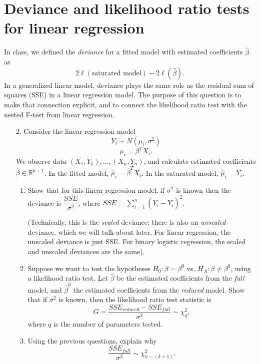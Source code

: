 \documentclass[11pt]{article}
\begin{document}
\section*{Deviance and likelihood ratio tests for linear regression}

In class, we defined the \textit{deviance} for a fitted model with estimated coefficients $\widehat{\beta}$ as 
$$2 \ell(\text{saturated model}) - 2 \ell (\widehat{\beta}).$$
In a generalized linear model, deviance plays the same role as the residual sum of squares (SSE) in a linear regression model. The purpose of this question is to make that connection explicit, and to connect the likelihood ratio test with the nested F-test from linear regression.

\begin{enumerate}
\item[2.] Consider the linear regression model
$$Y_i \sim N(\mu_i, \sigma^2)$$
$$\mu_i = \beta^T X_i.$$
We observe data $(X_1, Y_1),...,(X_n, Y_n)$, and calculate estimated coefficients $\widehat{\beta} \in \mathbb{R}^{k+1}$. In the fitted model, $\widehat{\mu}_i = \widehat{\beta}^T X_i$. In the saturated model, $\widehat{\mu}_i = Y_i$.

\begin{enumerate}
\item Show that for this linear regression model, if $\sigma^2$ is known then the deviance is $\dfrac{SSE}{\sigma^2}$, where $SSE = \sum \limits_{i=1}^n (Y_i - \widehat{Y}_i)^2$. 

(Technically, this is the \textit{scaled} deviance; there is also an \textit{unscaled} deviance, which we will talk about later. For linear regression, the unscaled deviance is just SSE. For binary logistic regression, the scaled and unscaled deviances are the same).

\item Suppose we want to test the hypotheses $H_0: \beta = \beta^0$ vs. $H_A: \beta \neq \beta^0$, using a likelihood ratio test. Let $\widehat{\beta}$ be the estimated coefficients from the \textit{full} model, and $\widehat{\beta}^0$ the estimated coefficients from the \textit{reduced} model. Show that if $\sigma^2$ is known, then the likelihood ratio test statistic is
$$G = \dfrac{SSE_{reduced} - SSE_{full}}{\sigma^2} \sim \chi^2_q,$$
where $q$ is the number of parameters tested.

\item Using the previous questions, explain why
$$\dfrac{SSE_{full}}{\sigma^2} \sim \chi^2_{n - (k + 1)}.$$


\end{enumerate}
\end{enumerate}
\end{document}
